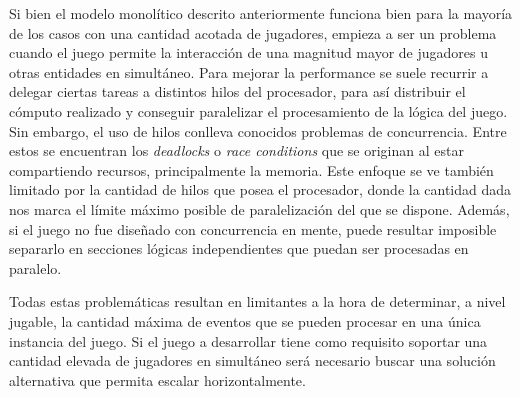 
\noindent Si bien el modelo monolítico descrito anteriormente funciona bien para la mayoría de los 
casos con una cantidad acotada de jugadores, empieza a ser un problema cuando el juego 
permite la interacción de una magnitud mayor de jugadores u otras entidades en simultáneo. 
Para mejorar la performance se suele recurrir a delegar ciertas tareas a distintos hilos del procesador, para así distribuir 
el cómputo realizado y conseguir paralelizar el procesamiento de la lógica del juego. 
Sin embargo, el uso de hilos conlleva conocidos problemas de concurrencia. Entre estos se encuentran los \textit{deadlocks} o \textit{race conditions} que se originan al estar compartiendo 
recursos, principalmente la memoria. Este enfoque se ve también limitado por la cantidad de hilos 
que posea el procesador, donde la cantidad dada nos marca el límite máximo posible de paralelización
del que se dispone. Además, si el juego no fue diseñado con concurrencia en mente, puede resultar imposible separarlo en secciones lógicas
independientes que puedan ser procesadas en paralelo.

Todas estas problemáticas resultan en limitantes a la hora de determinar, a nivel jugable,
la cantidad máxima de eventos que se pueden procesar en una única instancia del juego.
Si el juego a desarrollar tiene como requisito soportar una cantidad elevada de jugadores
en simultáneo será necesario buscar una solución alternativa que permita escalar horizontalmente.
